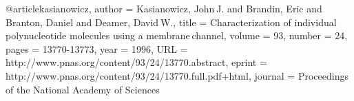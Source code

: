 @article{kasianowicz,
author = {Kasianowicz, John J. and Brandin, Eric and Branton, Daniel and Deamer, David W.}, 
title = {Characterization of individual polynucleotide molecules using a membrane channel}, 
volume = {93}, 
number = {24}, 
pages = {13770-13773}, 
year = {1996}, 
URL = {http://www.pnas.org/content/93/24/13770.abstract}, 
eprint = {http://www.pnas.org/content/93/24/13770.full.pdf+html}, 
journal = {Proceedings of the National Academy of Sciences} 
}